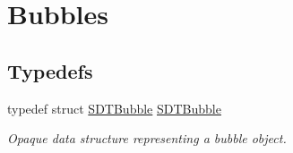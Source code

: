 \hypertarget{group__bubbles}{}\section{Bubbles}
\label{group__bubbles}
\subsection*{Typedefs}
\begin{DoxyCompactItemize}
\item 
\hypertarget{group__bubbles_ga112f59b24c7a304d0ff6280c98cf7e75}{}typedef struct \hyperlink{group__bubbles_ga112f59b24c7a304d0ff6280c98cf7e75}{S\+D\+T\+Bubble} \hyperlink{group__bubbles_ga112f59b24c7a304d0ff6280c98cf7e75}{S\+D\+T\+Bubble}\label{group__bubbles_ga112f59b24c7a304d0ff6280c98cf7e75}

\begin{DoxyCompactList}\small\item\em Opaque data structure representing a bubble object. \end{DoxyCompactList}\end{DoxyCompactItemize}
